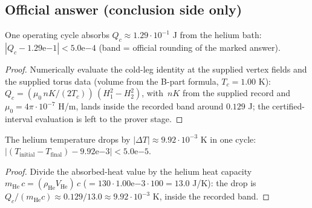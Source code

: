 \subsection*{Official answer (conclusion side only)}

\begin{theorem}
\label{thm:IPhO2026Problems_problem_IPhO_2026_3_C_3:absorbed_heat_value}
One operating cycle absorbs $Q_c \approx 1.29{\cdot}10^{-1}$ J from the helium
bath: $|Q_c - 1.29\mathrm{e}{-1}| < 5.0\mathrm{e}{-4}$ (band = official
rounding of the marked answer).
\end{theorem}
\begin{proof}
Numerically evaluate the cold-leg identity at the supplied vertex fields and
the supplied torus data (volume from the B-part formula, $T_c = 1.00$ K):
$Q_c = (\mu_0\, n K / (2 T_c))\,(H_1^2 - H_2^2)$, with\ $n K$ from the
supplied record and $\mu_0 = 4\pi{\cdot}10^{-7}$ H/m, lands inside the
recorded band around $0.129$ J; the certified-interval evaluation is left to
the prover stage.
\end{proof}

\begin{theorem}
\label{thm:IPhO2026Problems_problem_IPhO_2026_3_C_3:temperature_drop_value}
The helium temperature drops by $|\Delta T| \approx 9.92{\cdot}10^{-3}$ K in
one cycle: $|(T_{\mathrm{initial}} - T_{\mathrm{final}}) - 9.92\mathrm{e}{-3}| < 5.0\mathrm{e}{-5}$.
\end{theorem}
\begin{proof}
Divide the absorbed-heat value by the helium heat capacity
$m_{\mathrm{He}}\,c = (\rho_{\mathrm{He}} V_{\mathrm{He}})\,c$
($= 130 \cdot 1.00\mathrm{e}{-3} \cdot 100 = 13.0$ J/K): the drop is
$Q_c/(m_{\mathrm{He}} c) \approx 0.129/13.0 \approx 9.92{\cdot}10^{-3}$ K,
inside the recorded band.
\end{proof}


